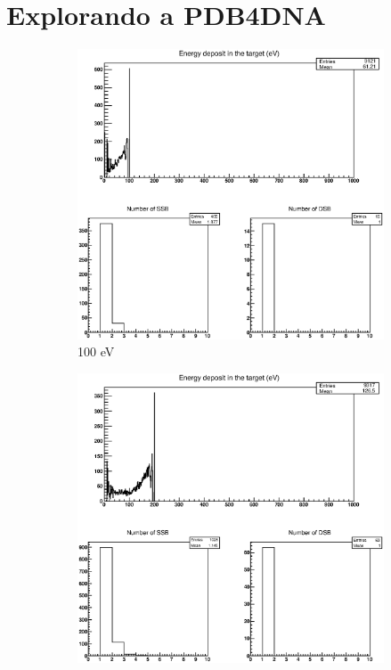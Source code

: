 
\clearpage

\section{Explorando a PDB4DNA}
\label{sec:MODIFI}

\begin{figure}
\centering
\begin{subfigure}{.5\textwidth}
  \centering
  \includegraphics[width=.78\linewidth]{./Figures/e-100ev.eps}
  \caption{100 eV}
  \label{fig:sube1}
\end{subfigure}%
\begin{subfigure}{.5\textwidth}
  \centering
  \includegraphics[width=.78\linewidth]{./Figures/e-200ev.eps}

\end{subfigure}
\end{figure}
